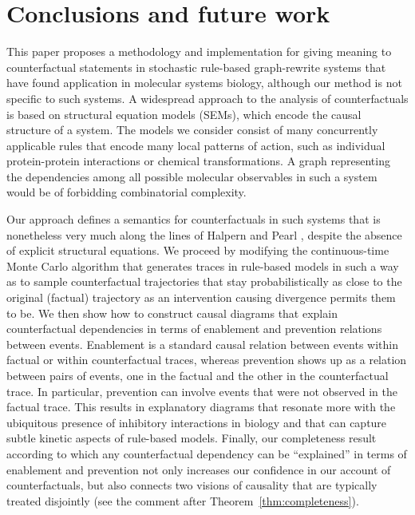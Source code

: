 
\section*{Conclusions and future work}

This paper proposes a methodology and implementation for giving
meaning to counterfactual statements in stochastic rule-based
graph-rewrite systems that have found application in molecular systems
biology, although our method is not specific to such systems. A
widespread approach to the analysis of counterfactuals is based on
structural equation models (SEMs), which encode the causal structure
of a system. The models we consider consist of many concurrently
applicable rules that encode many local patterns of action, such as
individual protein-protein interactions or chemical transformations. A
graph representing the dependencies among all possible molecular
observables in such a system would be of forbidding combinatorial
complexity.

Our approach defines a semantics for counterfactuals in such systems
that is nonetheless very much along the lines of Halpern and Pearl
\cite{pearl2009causality,halpern2016actual}, despite the absence of
explicit structural equations. We proceed by modifying the
continuous-time Monte Carlo algorithm that generates traces in
rule-based models in such a way as to sample counterfactual
trajectories that stay probabilistically as close to the original
(factual) trajectory as an intervention causing divergence permits
them to be. We then show how to construct causal diagrams that explain
counterfactual dependencies in terms of enablement and prevention
relations between events. Enablement is a standard causal relation
between events within factual or within counterfactual traces, whereas
prevention shows up as a relation between pairs of events, one in the
factual and the other in the counterfactual trace. In particular,
prevention can involve events that were not observed in the factual
trace. This results in explanatory diagrams that resonate more with
the ubiquitous presence of inhibitory interactions in biology and that
can capture subtle kinetic aspects of rule-based models.  Finally, our
completeness result according to which any counterfactual dependency
can be ``explained'' in terms of enablement and prevention not only
increases our confidence in our account of counterfactuals, but also
connects two visions of causality that are typically treated
disjointly (see the comment after Theorem~\ref{thm:completeness}).



